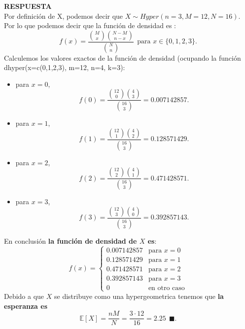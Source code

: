 \documentclass[11pt,letterpaper]{article}
\newcommand{\mE}{\mathbb{E}}
\newcommand{\res}{\textbf{RESPUESTA}\\}
\newcommand{\finf}{\blacksquare.}
\begin{document}
\begin{itemize}
\res 
Por definición de X, podemos decir que $X\sim Hyper(n=3, M=12, N=16)$. Por lo que podemos decir que la función de densidad es :
\begin{equation*}
f(x)= \frac{{M\choose x}{N-M\choose n-x}}{{N\choose n}}\ \ \text{para } x\in \{0,1,2,3\}.
\end{equation*}
Calculemos los valores exactos de la función de densidad (ocupando la función \textsf{dhyper(x=c(0,1,2,3), m=12, n=4, k=3)}:
\begin{itemize}
\item para $x=0$,
$$f(0)=\frac{{12\choose 0}{4\choose 3}}{{16\choose 3}}= 0.007142857.$$
\item para $x=1$,
$$f(1)=\frac{{12\choose 1}{4\choose 2}}{{16\choose 3}}= 0.128571429.$$
\item para $x=2$,
$$f(2)=\frac{{12\choose 2}{4\choose 1}}{{16\choose 3}}= 0.471428571.$$
\item para $x=3$,
$$f(3)=\frac{{12\choose 3}{4\choose 0}}{{16\choose 3}}= 0.392857143.$$
\end{itemize}
En conclusión \textbf{la función de densidad de $X$ es}: 
\begin{equation*}
f(x) = \left\{\begin{array}{ll}
0.007142857 & \text{para } x=0\\
0.128571429 & \text{para } x=1\\
0.471428571 & \text{para } x=2\\
0.392857143 & \text{para } x=3\\
0 & \text{en otro caso}
\end{array} \right.
\end{equation*}
Debido a que $X$ se distribuye como una hypergeometrica tenemos que \textbf{la  esperanza es} 
$$\mE[X]=\frac{nM}{N}=\frac{3\cdot12}{16}=2.25 \ \ \finf$$ 
\end{itemize}
\end{document}
